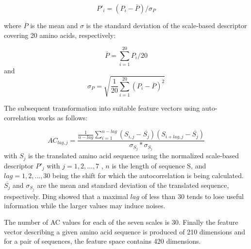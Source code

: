 \documentclass[preprint,3p,times,twocolumn]{elsarticle}
\begin{document}
\begin{equation}
P'_{i} = (P_i - \overline{P}) / \sigma_P
\end{equation}

where $\overline{P}$ is the mean and $\sigma$ is the standard
deviation of the scale-based descriptor covering 20 amino acids,
respectively: 

\begin{equation}
\overline{P} = \sum^{20}_{i=1}P_i / 20
\end{equation}
 and 
\begin{equation}
\sigma_P = \sqrt{\frac{1}{20} \sum^{20}_{i=1}(P_i - \overline{P})^2}
\end{equation}

The subsequent transformation into suitable feature vectors using
auto-correlation works as follows: 

\begin{equation}
AC_{lag, j} = \frac {\frac{1}{n-lag} \sum^{n-lag}_{i=1} ( S_{i,j} - \overline{S_j}) (S_{i+lag,j} - \overline{S_j})} { \sigma_{S_j} * \sigma_{S_j} }
\end{equation}
with $S_j$ is the translated amino acid sequence using the normalized
scale-based descriptor $P'_j$ with $j = 1, 2, \dots, 7$ , $n$ is the
length of sequence S, and $lag = 1, 2, \dots, 30$  being the shift for
which the autocorrelation is being calculated. $\overline{S_j}$ and
$\sigma_{S_j}$ are the mean and standard deviation of the translated
sequence, respectively. Ding \cite{Ding:2016} showed that a maximal
$lag$ of less than 30 tends to lose useful information while the
larger values may induce noises. 

The number of AC values for each of the seven scales is 30. Finally
the feature vector describing a given amino acid sequence is produced
of 210 dimensions and for a pair of sequences, the feature space
contains 420 dimensions. 
\end{document}

